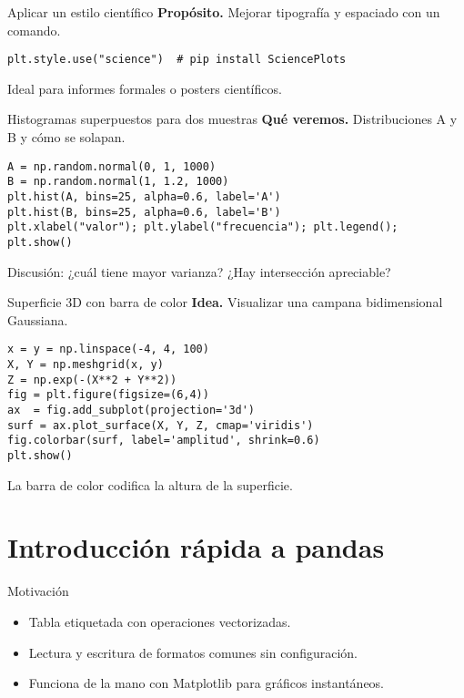 \documentclass[10pt]{beamer}
\begin{document}
\begin{frame}[fragile]{Aplicar un estilo científico}
\textbf{Propósito.} Mejorar tipografía y espaciado con un comando.
\begin{verbatim}
plt.style.use("science")  # pip install SciencePlots
\end{verbatim}
Ideal para informes formales o posters científicos.
\end{frame}

\begin{frame}[fragile]{Histogramas superpuestos para dos muestras}
\textbf{Qué veremos.} Distribuciones A y B y cómo se solapan.
\begin{verbatim}
A = np.random.normal(0, 1, 1000)
B = np.random.normal(1, 1.2, 1000)
plt.hist(A, bins=25, alpha=0.6, label='A')
plt.hist(B, bins=25, alpha=0.6, label='B')
plt.xlabel("valor"); plt.ylabel("frecuencia"); plt.legend(); plt.show()
\end{verbatim}
Discusión: ¿cuál tiene mayor varianza? ¿Hay intersección apreciable?
\end{frame}

\begin{frame}[fragile]{Superficie 3D con barra de color}
\textbf{Idea.} Visualizar una campana bidimensional Gaussiana.
\begin{verbatim}
x = y = np.linspace(-4, 4, 100)
X, Y = np.meshgrid(x, y)
Z = np.exp(-(X**2 + Y**2))
fig = plt.figure(figsize=(6,4))
ax  = fig.add_subplot(projection='3d')
surf = ax.plot_surface(X, Y, Z, cmap='viridis')
fig.colorbar(surf, label='amplitud', shrink=0.6)
plt.show()
\end{verbatim}
La barra de color codifica la altura de la superficie.
\end{frame}

\section{Introducción rápida a pandas}
\begin{frame}{Motivación}
\begin{itemize}
  \item Tabla etiquetada con operaciones vectorizadas.  
  \item Lectura y escritura de formatos comunes sin configuración.  
  \item Funciona de la mano con Matplotlib para gráficos instantáneos.
\end{itemize}
\end{frame}
\end{document}
